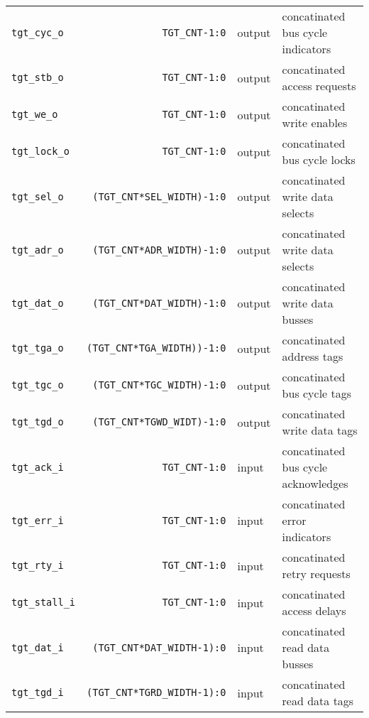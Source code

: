 \begin{center}
\begin{longtable}{|l|r|l|l|}
    \texttt{tgt\_cyc\_o}         & \texttt{TGT\_CNT-1:0}               & output & concatinated bus cycle indicators   \\
    \texttt{tgt\_stb\_o}         & \texttt{TGT\_CNT-1:0}               & output & concatinated access requests	      \\
    \texttt{tgt\_we\_o}          & \texttt{TGT\_CNT-1:0}               & output & concatinated write enables	      \\
    \texttt{tgt\_lock\_o}        & \texttt{TGT\_CNT-1:0}               & output & concatinated bus cycle locks	      \\
    \texttt{tgt\_sel\_o}         & \texttt{(TGT\_CNT*SEL\_WIDTH)-1:0}  & output & concatinated write data selects     \\
    \texttt{tgt\_adr\_o}         & \texttt{(TGT\_CNT*ADR\_WIDTH)-1:0}  & output & concatinated write data selects     \\
    \texttt{tgt\_dat\_o}         & \texttt{(TGT\_CNT*DAT\_WIDTH)-1:0}  & output & concatinated write data busses      \\
    \texttt{tgt\_tga\_o}         & \texttt{(TGT\_CNT*TGA\_WIDTH))-1:0} & output & concatinated address tags	      \\
    \texttt{tgt\_tgc\_o}         & \texttt{(TGT\_CNT*TGC\_WIDTH)-1:0}  & output & concatinated bus cycle tags	      \\
    \texttt{tgt\_tgd\_o}         & \texttt{(TGT\_CNT*TGWD\_WIDT)-1:0}  & output & concatinated write data tags	      \\
    \texttt{tgt\_ack\_i}         & \texttt{TGT\_CNT-1:0}               & input  & concatinated bus cycle acknowledges \\
    \texttt{tgt\_err\_i}         & \texttt{TGT\_CNT-1:0}               & input  & concatinated error indicators	      \\
    \texttt{tgt\_rty\_i}         & \texttt{TGT\_CNT-1:0}               & input  & concatinated retry requests	      \\
    \texttt{tgt\_stall\_i}       & \texttt{TGT\_CNT-1:0}               & input  & concatinated access delays	      \\
    \texttt{tgt\_dat\_i}         & \texttt{(TGT\_CNT*DAT\_WIDTH-1):0} & input  & concatinated read data busses	      \\
    \texttt{tgt\_tgd\_i}         & \texttt{(TGT\_CNT*TGRD\_WIDTH-1):0} & input  & concatinated read data tags         \\   
  \end{longtable}
\end{center}  
\endgroup

